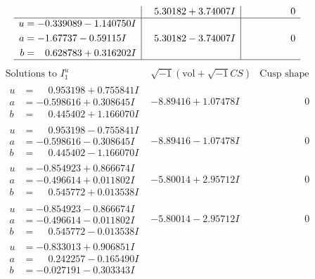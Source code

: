 \documentclass[1p]{elsarticle_modified}
\theoremstyle{definition}
\newcommand{\I}{\sqrt{-1}}
\begin{document}
$$\begin{array}{c|c|c}
 & \phantom{-}5.30182 + 3.74007 I & \phantom{-0.000000 } 0 \\ \hline\begin{aligned}
u &= -0.339089 - 1.140750 I \\
a &= -1.67737 - 0.59115 I \\
b &= \phantom{-}0.628783 + 0.316202 I\end{aligned}
 & \phantom{-}5.30182 - 3.74007 I & \phantom{-0.000000 } 0\\
 \hline 
 \end{array}$$\newpage$$\begin{array}{c|c|c}  
\text{Solutions to }I^u_{1}& \I (\text{vol} + \sqrt{-1}CS) & \text{Cusp shape}\\
 \hline 
\begin{aligned}
u &= \phantom{-}0.953198 + 0.755841 I \\
a &= -0.598616 + 0.308645 I \\
b &= \phantom{-}0.445402 + 1.166070 I\end{aligned}
 & -8.89416 + 1.07478 I & \phantom{-0.000000 } 0 \\ \hline\begin{aligned}
u &= \phantom{-}0.953198 - 0.755841 I \\
a &= -0.598616 - 0.308645 I \\
b &= \phantom{-}0.445402 - 1.166070 I\end{aligned}
 & -8.89416 - 1.07478 I & \phantom{-0.000000 } 0 \\ \hline\begin{aligned}
u &= -0.854923 + 0.866674 I \\
a &= -0.496614 + 0.011802 I \\
b &= \phantom{-}0.545772 + 0.013538 I\end{aligned}
 & -5.80014 + 2.95712 I & \phantom{-0.000000 } 0 \\ \hline\begin{aligned}
u &= -0.854923 - 0.866674 I \\
a &= -0.496614 - 0.011802 I \\
b &= \phantom{-}0.545772 - 0.013538 I\end{aligned}
 & -5.80014 - 2.95712 I & \phantom{-0.000000 } 0 \\ \hline\begin{aligned}
u &= -0.833013 + 0.906851 I \\
a &= \phantom{-}0.242257 - 0.165490 I \\
b &= -0.027191 - 0.303343 I\end{aligned}

\end{array}$$
\end{document}

